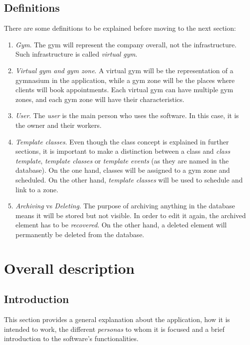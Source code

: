 \documentclass[a4paper, 12pt, oneside]{book}
\begin{document}
\subsection{Definitions}
There are some definitions to be explained before moving to the next section:
\begin{enumerate}[label = -]
	\item \emph{Gym}. The gym will represent the company overall, not the infrastructure. Such infrastructure is called \emph{virtual gym}.
	\item \emph{Virtual gym and gym zone}. A virtual gym will be the representation of a gymnasium in the application, while a gym zone will be the places where clients will book appointments. Each virtual gym can have multiple gym zones, and each gym zone will have their characteristics.
	\item \emph{User}. The \emph{user} is the main person who uses the software. In this case, it is the owner and their workers.
	\item \emph{Template classes}. Even though the class concept is explained in further sections, it is important to make a distinction between a class and \emph{class template}, \emph{template classes} or \emph{template events} (as they are named in the database). On the one hand, classes will be assigned to a gym zone and scheduled. On the other hand, \emph{template classes} will be used to schedule and link to a zone.
	\item \emph{Archiving} vs \emph{Deleting}. The purpose of archiving anything in the database means it will be stored but not visible. In order to edit it again, the archived element has to be \emph{recovered}. On the other hand, a deleted element will permanently be deleted from the database.
\end{enumerate}
\section{Overall description}
\subsection{Introduction}
This section provides a general explanation about the application, how it is intended to work, the different \emph{personas} to whom it is focused and a brief introduction to the software's functionalities.
\end{document}
